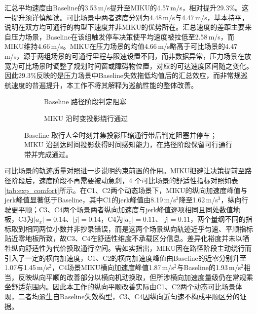 \documentclass[a4paper,11pt]{ctexart}
\providecommand{\datapath}{../../图片/data/01_crossing_ped/}
\theoremstyle{definition}
\begin{document}
汇总平均速度由Baseline的3.53\,m/s提升至MIKU的4.57\,m/s，相对提升29.3\%。这一提升须谨慎解读。可比场景中两者速度分别为4.48\,m/s与4.47\,m/s，基本持平，说明在双方均可通行的构型下速度并非MIKU的优势所在。汇总速度的差距主要来自压力场景，Baseline在该组触发停车决策使平均速度被拉低至2.58\,m/s，而MIKU维持4.66\,m/s。MIKU在压力场景的均值4.66\,m/s略高于可比场景的4.47\,m/s，源于两组场景的可通行里程与限速设置不同，而非数据异常，压力场景在放宽为可比场景时调整了规划时间窗或障碍物位置，对应的可达速度区间随之变化。因此29.3\%反映的是压力场景中Baseline失效拖低均值后的汇总效应，而非常规巡航速度的普遍提升，本工作不将其解释为巡航性能的整体改善。

\begin{figure}[htbp]
\centering
\begingroup
\renewcommand{\datapath}{../../图片/data/01_crossing_ped/}
\begin{subfigure}[b]{0.46\textwidth}
  \centering
  \caption{Baseline 路径阶段判定阻塞}
\end{subfigure}\hfill
\begin{subfigure}[b]{0.46\textwidth}
  \centering
  \caption{MIKU 沿时变投影绕行通过}
\end{subfigure}
\endgroup
\caption{压力场景 P1 单行人横穿的 SL 路径边界对照}
\caption*{Baseline 取行人全时刻并集投影压缩通行带后判定阻塞并停车；MIKU 沿到达时间投影获得时间感知能力，在路径阶段保留可行通行带并完成通过。}
\label{fig:exp_p1_sl}
\end{figure}

可比场景的轨迹质量对照进一步说明约束前置的作用。MIKU把避让决策提前至路径阶段后，速度阶段不再需要被动急刹，4 个可比场景的舒适性指标对照如表\ref{tab:exp_comfort}所示。在C1、C2两个动态场景下，MIKU的纵向加速度峰值与jerk峰值显著低于Baseline，其中C1的jerk峰值由8.19\,m/s$^3$降至1.62\,m/s$^3$，纵向行驶更平顺；C3、C4两个场景两者纵向加速度与jerk峰值逐项相同且同处数值地板，C3为$|a_x|=0.14$、$|j|=0.14$，C4为$|a_x|=0.11$、$|j|=0.11$，两个量纲不同的指标取到相同两位小数并非抄录错误，而是这两个场景纵向轨迹近乎匀速、平顺指标贴近零地板所致，故C3、C4在舒适性维度不承载区分信息。差异化裕度并未以牺牲纵向舒适性为代价换取通行空间。需如实指出，MIKU因在路径阶段主动绕行而引入了一定的横向加速度，C1、C2的横向加速度峰值由Baseline的近零分别升至1.07与1.45\,m/s$^2$，C4场景MIKU横向加速度峰值1.87\,m/s$^2$与Baseline的1.93\,m/s$^2$相当，反映纵向平顺的改善部分以横向机动换取，但所涉横向加速度量级仍在常规乘坐舒适范围内。因此本工作的纵向平顺改善实际由C1、C2两个动态可比场景体现，二者均派生自Baseline失效构型，C3、C4因纵向近匀速不构成平顺区分的证据。
\end{document}
